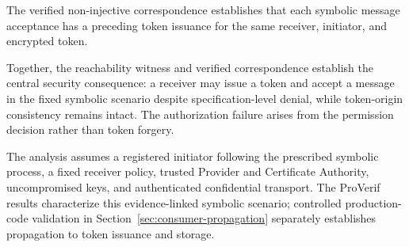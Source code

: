 The verified non-injective correspondence
establishes that each symbolic message acceptance
has a preceding token issuance for the same
receiver, initiator, and encrypted token.

Together, the reachability witness and verified
correspondence establish the central security
consequence: a receiver may issue a token and
accept a message in the fixed symbolic scenario
despite specification-level denial, while
token-origin consistency remains intact.
The authorization failure arises from the
permission decision rather than token forgery.

The analysis assumes a registered initiator
following the prescribed symbolic process,
a fixed receiver policy, trusted Provider and
Certificate Authority, uncompromised keys,
and authenticated confidential transport.
The ProVerif results characterize this
evidence-linked symbolic scenario; controlled
production-code validation in
Section~\ref{sec:consumer-propagation}
separately establishes propagation to token
issuance and storage.
